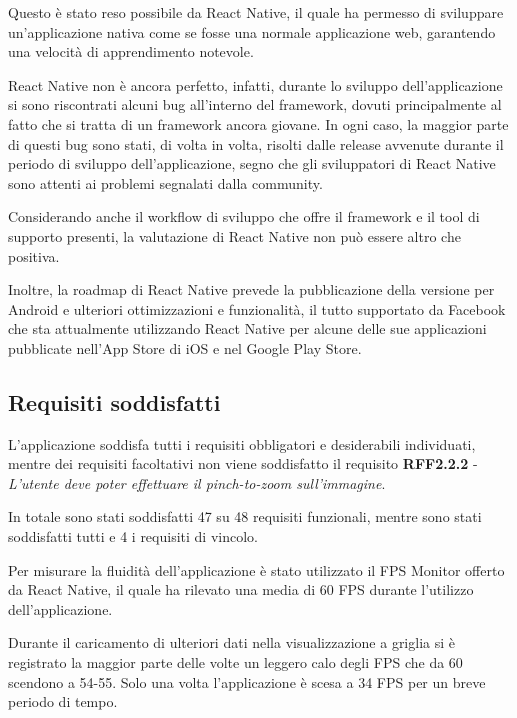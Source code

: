 Questo è stato reso possibile da React Native, il quale ha permesso di sviluppare un'applicazione nativa come se fosse una normale applicazione web, garantendo una velocità di apprendimento notevole.

React Native non è ancora perfetto, infatti, durante lo sviluppo dell'applicazione si sono riscontrati alcuni bug all'interno del framework, dovuti principalmente al fatto che si tratta di un framework ancora giovane.
In ogni caso, la maggior parte di questi bug sono stati, di volta in volta, risolti dalle release avvenute durante il periodo di sviluppo dell'applicazione, segno che gli sviluppatori di React Native sono attenti ai problemi segnalati dalla community.

Considerando anche il workflow di sviluppo che offre il framework e il tool di supporto presenti, la valutazione di React Native non può essere altro che positiva.

Inoltre, la roadmap di React Native prevede la pubblicazione della versione per Android e ulteriori ottimizzazioni e funzionalità, il tutto supportato da Facebook che sta attualmente utilizzando React Native per alcune delle sue applicazioni pubblicate nell'App Store di iOS e nel Google Play Store.


\subsection{Requisiti soddisfatti}

L'applicazione soddisfa tutti i requisiti obbligatori e desiderabili individuati, mentre dei requisiti facoltativi non viene soddisfatto il requisito
\textbf{RFF2.2.2} - \textit{L'utente deve poter effettuare il pinch-to-zoom sull'immagine}.

In totale sono stati soddisfatti 47 su 48 requisiti funzionali, mentre sono stati soddisfatti tutti e 4 i requisiti di vincolo.

Per misurare la fluidità dell'applicazione è stato utilizzato il FPS Monitor offerto da React Native, il quale ha rilevato una media di 60 FPS durante l'utilizzo dell'applicazione.

Durante il caricamento di ulteriori dati nella visualizzazione a griglia si è registrato la maggior parte delle volte un leggero calo degli FPS che da 60 scendono a 54-55.
Solo una volta l'applicazione è scesa a 34 FPS per un breve periodo di tempo.

